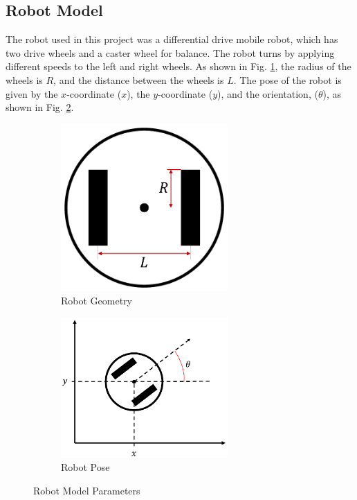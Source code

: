 \subsection{Robot Model}\label{subsec:robotModel}
The robot used in this project was a differential drive mobile robot, which has
two drive wheels and a caster wheel for balance. The robot turns by applying
different speeds to the left and right wheels. As shown in Fig.
\ref{fig:robotGeometry}, the radius of the wheels is $R$, and the distance
between the wheels is $L$. The pose of the robot is given by the $x$-coordinate
($x$), the $y$-coordinate ($y$), and the orientation, ($\theta$), as shown in
Fig. \ref{fig:robotPose}. %
%
\begin{figure}[H]
    \centering
    \begin{subfigure}{0.3\textwidth}
        \centering
        \includegraphics[width=0.7\textwidth]{figs/robotGeometry.pdf}
        \caption{Robot Geometry}
        \label{fig:robotGeometry}
    \end{subfigure}%
    \begin{subfigure}{0.7\textwidth}
        \centering
        \includegraphics[width=0.7\textwidth]{figs/robotPose.pdf}
        \caption{Robot Pose}
        \label{fig:robotPose}
    \end{subfigure}
    \caption{Robot Model Parameters}
    \label{fig:robotModelParameters}
\end{figure}
%

